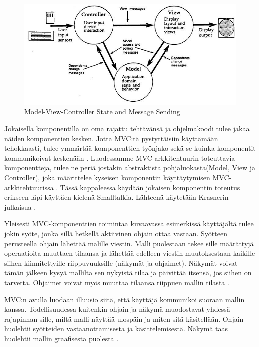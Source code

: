 \documentclass[finnish,utf8,nonumbib,palatino,kandi]{gradu2}
\begin{document}
\begin{figure}[h]
\centering
\includegraphics[scale=0.85]{krasner_mvc.jpg}
\caption{Model-View-Controller State and Message Sending \cite[s. 5]{Krasner:desc}}
\end{figure}

Jokaisella komponentilla on oma rajattu tehtävänsä ja ohjelmakoodi tulee jakaa näiden komponentien kesken. Jotta MVC:tä pystyttäisiin käyttämään
tehokkaasti, tulee ymmärtää komponenttien työnjako sekä se kuinka komponentit kommunikoivat keskenään \cite{Burbeck}.  Luodessamme MVC-arkkitehtuurin
toteuttavia komponentteja, tulee ne periä jostakin abstraktista pohjaluokasta(Model, View ja Controller), joka määrittelee kyseisen komponentin käyttäytymisen MVC-arkkitehtuurissa  \cite[s. 5]{Krasner:desc}.  Tässä kappaleessa käydään jokaisen komponentin toteutus erikseen läpi käyttäen kielenä Smalltalkia. Lähteenä käytetään Krasnerin julkaisua \cite{Krasner:desc}.

Yleisesti MVC-komponenttien toimintaa kuvaavassa esimerkissä käyttäjältä tulee jokin syöte, jonka sillä hetkellä aktiivinen ohjain ottaa vastaan. Syötteen perusteella ohjain lähettää malille viestin. Malli puolestaan
tekee sille määrättyjä operaatioita muuttaen tilaansa ja lähettää edelleen viestin muutoksestaan kaikille siihen kiinnitettyille riippuvuuksille (näkymät ja ohjaimet). Näkymät
voivat tämän jälkeen kysyä mallilta sen nykyistä tilaa ja päivittää itsensä, jos siihen on tarvetta. Ohjaimet voivat myös muuttaa tilaansa riippuen mallin tilasta \cite[s. 4]{Krasner:desc}.

MVC:n avulla luodaan illuusio siitä, että käyttäjä kommunikoi suoraan mallin kanssa. Todellisuudessa kuitenkin ohjain ja näkymä muodostavat yhdessä rajapinnan sille, miltä malli näyttää ulospäin ja miten sitä käsitellään. Ohjain huolehtii syötteiden vastaanottamisesta ja käsittelemisestä. Näkymä taas huolehtii mallin graafisesta puolesta \cite[s. 11-12]{Reenskaug:tools}. 
\end{document}
